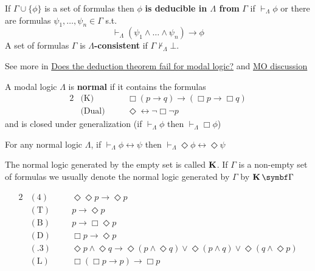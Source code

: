 \documentclass[11pt]{article}
\begin{document}
\begin{definition}[]
If \(\Gamma\cup\{\phi\}\) is a set of formulas then \(\phi\) \textbf{is deducible in \(\Lambda\) from}
\(\Gamma\) if \(\vdash_\Lambda\phi\) or there are formulas
\(\psi_1,\dots,\psi_n\in\Gamma\) s.t.
\begin{equation*}
\vdash_\Lambda(\psi_1\wedge\dots\wedge\psi_n)\to\phi
\end{equation*}
A set of formulas \(\Gamma\) is \textbf{\(\Lambda\)-consistent} if \(\Gamma\not\vdash_\Lambda\bot\).
\end{definition}

See more in \href{https://www.mv.helsinki.fi/home/negri/selected\_pub/dedthm.pdf}{Does the deduction theorem fail for modal logic?} and
\href{https://mathoverflow.net/questions/132268/deduction-theorem/132295}{MO discussion}

\begin{definition}[]
A modal logic \(\Lambda\) is \textbf{normal} if it contains the formulas
\begin{alignat*}{2}
&\text{(K)}&&\Box(p\to q)\to(\Box p\to\Box q)\\
&\text{(Dual)}\quad&&\Diamond\leftrightarrow\neg\Box\neg p
\end{alignat*}
and is closed under generalization (if \(\vdash_{\Lambda}\phi\) then \(\vdash_{\Lambda}\Box\phi\))
\end{definition}

\begin{lemma}[]
For any normal logic \(\Lambda\), if \(\vdash_\Lambda\phi\leftrightarrow\psi\) then
\(\vdash_\Lambda\Diamond\phi\leftrightarrow\Diamond\psi\)
\end{lemma}

The normal logic generated by the empty set is called \(\operatorname{\textbf{K}}\). If \(\Gamma\) is a
non-empty set of formulas we usually denote the normal logic generated by \(\Gamma\)
by \(\bK\bGamma\)

\begin{alignat*}{2}
&(4)&&\Diamond\Diamond p\to\Diamond p\\
&(\text{T})&&p\to\Diamond p\\
&(\text{B})&&p\to\Box\Diamond p\\
&(\text{D})&&\Box p\to\Diamond p\\
&(\text{.3})&&\Diamond p\wedge\Diamond q\to
\Diamond(p\wedge\Diamond q)\vee\Diamond(p\wedge q)\vee\Diamond
(q\wedge \Diamond p)\\
&(\text{L})\quad&&\Box(\Box p\to p)\to\Box p
\end{alignat*}
\end{document}
